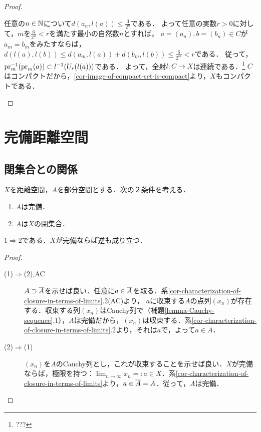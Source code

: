 \documentclass[uplatex,dvipdfmx]{jsreport}
\begin{document}
\begin{proof}
\begin{description}
\begin{description}
            任意の$n\in\mathbb{N}$について$d(a_n,l(a))\le\frac{3}{2^n}$である．
            よって任意の実数$r>0$に対して，$m$を$\frac{6}{2^n}<r$を満たす最小の自然数$n$とすれば，
            $a=(a_n),b=(b_n)\in C$が$a_m=b_m$をみたすならば，$d(l(a),l(b))\le d(a_m,l(a))+d(b_m,l(b))\le\frac{6}{2^m}<r$である．
            従って，$\mathrm{pr}^{-1}_m(\mathrm{pr}_m(a))\subset l^{-1}(U_r(l(a)))$である．
            よって，全射$l:C\to X$は連続である．\footnote{???}
            $C$はコンパクトだから，\ref{cor-image-of-compact-set-is-compact}より，$X$もコンパクトである．
        \end{description}
    \end{description}
\end{proof}

\section{完備距離空間}

\subsection{閉集合との関係}

\begin{proposition}[距離空間内の閉集合]\label{prop-complete-sets-in-metric-space}
    $X$を距離空間，$A$を部分空間とする．次の２条件を考える．
    \begin{enumerate}
        \item $A$は完備．
        \item $A$は$X$の閉集合．
    \end{enumerate}
    1$\Rightarrow$2である．$X$が完備ならば逆も成り立つ．
\end{proposition}
\begin{proof}\mbox{}
    \begin{description}
        \item[(1)$\Rightarrow$(2),AC] $A\supset\overline{A}$を示せば良い．任意に$a\in\overline{A}$を取る．系\ref{cor-characterization-of-closure-in-terms-of-limits}.2(AC)より，
        $a$に収束する$A$の点列$(x_n)$が存在する．収束する列$(x_n)$はCauchy列で（補題\ref{lemma-Cauchy-sequence}.1），$A$は完備だから，$(x_n)$は収束する．系\ref{cor-characterization-of-closure-in-terms-of-limits}.2より，それは$a$で，よって$a\in A$．
        \item[(2)$\Rightarrow$(1)]
        $(x_n)$を$A$のCauchy列とし，これが収束することを示せば良い．$X$が完備ならば，極限を持つ：$\lim_{n\to\infty}x_n=:a\in X$．系\ref{cor-characterization-of-closure-in-terms-of-limits}より，$a\in\overline{A}=A$．従って，$A$は完備．
    \end{description}
\end{proof}
\end{document}
